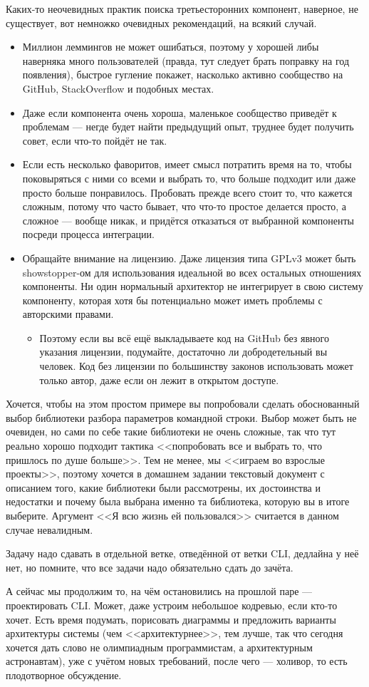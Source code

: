 \documentclass[a5paper]{article}
\begin{document}
Каких-то неочевидных практик поиска третьесторонних компонент, наверное, не существует, вот немножко очевидных рекомендаций, на всякий случай.
\begin{itemize}
	\item Миллион леммингов не может ошибаться, поэтому у хорошей либы наверняка много пользователей (правда, тут следует брать поправку на год появления), быстрое гугление покажет, насколько активно сообщество на GitHub, StackOverflow и подобных местах.
	\item Даже если компонента очень хороша, маленькое сообщество приведёт к проблемам --- негде будет найти предыдущий опыт, труднее будет получить совет, если что-то пойдёт не так.
	\item Если есть несколько фаворитов, имеет смысл потратить время на то, чтобы поковыряться с ними со всеми и выбрать то, что больше подходит или даже просто больше понравилось. Пробовать прежде всего стоит то, что кажется сложным, потому что часто бывает, что что-то простое делается просто, а сложное --- вообще никак, и придётся отказаться от выбранной компоненты посреди процесса интеграции. 
	\item Обращайте внимание на лицензию. Даже лицензия типа GPLv3 может быть showstopper-ом для использования идеальной во всех остальных отношениях компоненты. Ни один нормальный архитектор не интегрирует в свою систему компоненту, которая хотя бы потенциально может иметь проблемы с авторскими правами.
	\begin{itemize}
		\item Поэтому если вы всё ещё выкладываете код на GitHub без явного указания лицензии, подумайте, достаточно ли добродетельный вы человек. Код без лицензии по большинству законов использовать может только автор, даже если он лежит в открытом доступе.
	\end{itemize}
\end{itemize}

Хочется, чтобы на этом простом примере вы попробовали сделать обоснованный выбор библиотеки разбора параметров командной строки. Выбор может быть не очевиден, но сами по себе такие библиотеки не очень сложные, так что тут реально хорошо подходит тактика <<попробовать все и выбрать то, что пришлось по душе больше>>. Тем не менее, мы <<играем во взрослые проекты>>, поэтому хочется в домашнем задании текстовый документ с описанием того, какие библиотеки были рассмотрены, их достоинства и недостатки и почему была выбрана именно та библиотека, которую вы в итоге выберите. Аргумент <<Я всю жизнь ей пользовался>> считается в данном случае невалидным.

Задачу надо сдавать в отдельной ветке, отведённой от ветки CLI, дедлайна у неё нет, но помните, что все задачи надо обязательно сдать до зачёта.

А сейчас мы продолжим то, на чём остановились на прошлой паре --- проектировать CLI. Может, даже устроим небольшое кодревью, если кто-то хочет. Есть время подумать, порисовать диаграммы и предложить варианты архитектуры системы (чем <<архитектурнее>>, тем лучше, так что сегодня хочется дать слово не олимпиадным программистам, а архитектурным астронавтам), уже с учётом новых требований, после чего --- холивор, то есть плодотворное обсуждение.
\end{document}

